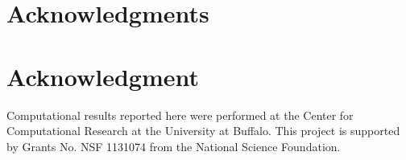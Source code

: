 \documentclass[conference,compsoc]{IEEEtran}
\begin{document}


\ifCLASSOPTIONcompsoc
  \section*{Acknowledgments}
\else
  \section*{Acknowledgment}
\fi

Computational results reported here were performed at
the Center for Computational Research at the University at
Buffalo. This project is supported by Grants No. NSF
1131074 from the National Science
Foundation.







%

%
%
%


\end{document}
